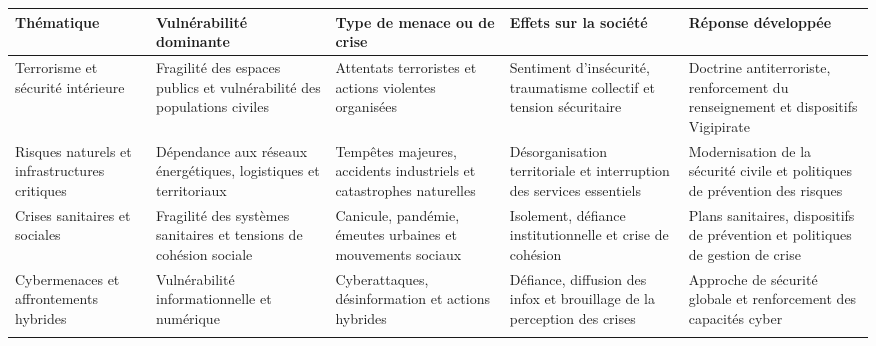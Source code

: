 \begin{table}[H]
\centering
\StyledTableSetup

\xdef\noteVulnerabilitesTerrorisme{\number\value{footnote}}
\xdef\noteVulnerabilitesRisquesNaturels{\number\value{footnote}}
\xdef\noteVulnerabilitesCrisesSanitaires{\number\value{footnote}}
\xdef\noteVulnerabilitesInterdependances{\number\value{footnote}}

\begin{tabularx}{\linewidth}{@{}
p{2.8cm}
Y
Y
Y
Y
@{}}

\toprule
\textbf{Thématique} &
\textbf{Vulnérabilité dominante} &
\textbf{Type de menace ou de crise} &
\textbf{Effets sur la société} &
\textbf{Réponse développée} \\
\midrule

Terrorisme et sécurité intérieure\footnotemark[\noteVulnerabilitesTerrorisme] &
Fragilité des espaces publics et vulnérabilité des populations civiles &
Attentats terroristes et actions violentes organisées &
Sentiment d'insécurité, traumatisme collectif et tension sécuritaire &
Doctrine antiterroriste, renforcement du renseignement et dispositifs Vigipirate \\
\addlinespace

Risques naturels et infrastructures critiques\footnotemark[\noteVulnerabilitesRisquesNaturels] &
Dépendance aux réseaux énergétiques, logistiques et territoriaux &
Tempêtes majeures, accidents industriels et catastrophes naturelles &
Désorganisation territoriale et interruption des services essentiels &
Modernisation de la sécurité civile et politiques de prévention des risques \\
\addlinespace

Crises sanitaires et sociales\footnotemark[\noteVulnerabilitesCrisesSanitaires] &
Fragilité des systèmes sanitaires et tensions de cohésion sociale &
Canicule, pandémie, émeutes urbaines et mouvements sociaux &
Isolement, défiance institutionnelle et crise de cohésion &
Plans sanitaires, dispositifs de prévention et politiques de gestion de crise \\
\addlinespace

Cybermenaces et affrontements hybrides &
Vulnérabilité informationnelle et numérique &
Cyberattaques, désinformation et actions hybrides &
Défiance, diffusion des infox et brouillage de la perception des crises &
Approche de sécurité globale et renforcement des capacités cyber \\
\addlinespace


\end{tabularx}
\end{table}
